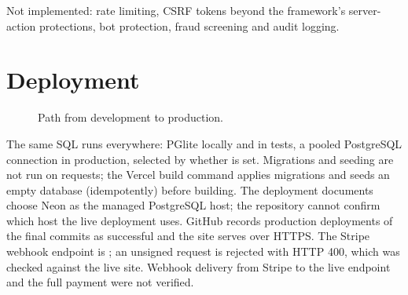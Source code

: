 Not implemented: rate limiting, CSRF tokens beyond the framework's server-action protections, bot protection, fraud screening and audit logging.

\section{Deployment}

\begin{figure}[H]
\centering
{}
\caption{Path from development to production.}
\label{fig:deploy}
\end{figure}

The same SQL runs everywhere: PGlite locally and in tests, a pooled PostgreSQL connection in production, selected by whether  is set. Migrations and seeding are not run on requests; the Vercel build command applies migrations and seeds an empty database (idempotently) before building. The deployment documents choose Neon as the managed PostgreSQL host; the repository cannot confirm which host the live deployment uses. GitHub records production deployments of the final commits as successful and the site serves over HTTPS. The Stripe webhook endpoint is ; an unsigned request is rejected with HTTP 400, which was checked against the live site. Webhook delivery from Stripe to the live endpoint and the full payment were not verified. \tagunver{}
